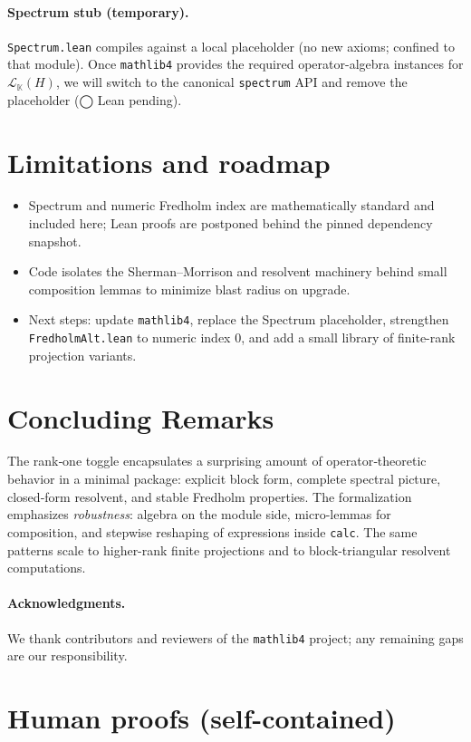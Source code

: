 \documentclass[11pt]{article}
\theoremstyle{definition}
\newcommand{\K}{\mathbb{K}}
\newcommand{\CL}[2]{\mathcal{L}_{#1}(#2)} %
\newcommand{\leanpending}{\textsf{\small \textcolor{orange!80!black}{◯ Lean pending}}}
\begin{document}
\paragraph{Spectrum stub (temporary).}
\texttt{Spectrum.lean} compiles against a local placeholder (no new axioms; confined to that module). Once \texttt{mathlib4} provides the required operator-algebra instances for $\CL{\K}{H}$, we will switch to the canonical \texttt{spectrum} API and remove the placeholder (\leanpending).

\section{Limitations and roadmap}
\begin{itemize}
\item Spectrum and numeric Fredholm index are mathematically standard and included here; Lean proofs are postponed behind the pinned dependency snapshot.
\item Code isolates the Sherman--Morrison and resolvent machinery behind small composition lemmas to minimize blast radius on upgrade.
\item Next steps: update \texttt{mathlib4}, replace the Spectrum placeholder, strengthen \texttt{FredholmAlt.lean} to numeric index $0$, and add a small library of finite-rank projection variants.
\end{itemize}

\section{Concluding Remarks}

The rank‑one toggle encapsulates a surprising amount of operator‑theoretic behavior in a minimal package: explicit block form, complete spectral picture, closed‑form resolvent, and stable Fredholm properties. The formalization emphasizes \emph{robustness}: algebra on the module side, micro-lemmas for composition, and stepwise reshaping of expressions inside \texttt{calc}. The same patterns scale to higher-rank finite projections and to block-triangular resolvent computations.

\paragraph{Acknowledgments.}
We thank contributors and reviewers of the \texttt{mathlib4} project; any remaining gaps are our responsibility.

\appendix
\section{Human proofs (self-contained)}\label{sec:human-proofs}
\end{document}

